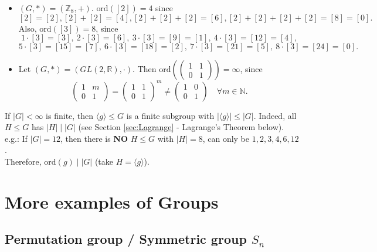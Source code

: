 \begin{example}
\begin{itemize}
    \item $(G, *) = (\mathbb{Z}_8, +)$. $\text{ord}([2]) = 4$ since $$[2]=[2], [2]+[2]=[4], [2]+[2]+[2]=[6], [2]+[2]+[2]+[2]=[8] = [0].$$
    Also, $\text{ord}([3]) = 8$, since 
    $$1 \cdot [3]=[3],\ 2 \cdot [3] =[6],\ 3 \cdot [3]=[9] = [1],\ 4 \cdot [3]=[12] = [4],$$ $$5 \cdot [3]=[15] = [7],\ 6 \cdot [3]=[18] = [2],\ 7 \cdot [3]=[21] = [5],\ 8 \cdot [3] =[24] = [0].$$
    \item Let $(G, *) = (GL(2, \mathbb{R}), \cdot)$. Then 
    $\text{ord}\left( \begin{pmatrix} 1 & 1 \\ 0 & 1 \end{pmatrix} \right) = \infty$, since $$\begin{pmatrix} 1 & m \\ 0 & 1 \end{pmatrix} = \begin{pmatrix} 1 & 1 \\ 0 & 1 \end{pmatrix}^m \neq \begin{pmatrix} 1 & 0 \\ 0 & 1 \end{pmatrix} \quad \forall m \in \mathbb{N}.$$
\end{itemize}
\end{example}
\vspace{1em}
\begin{remark} 
If $|G| < \infty$ is finite, then $\langle g \rangle \le G$ is a finite subgroup with $|\langle g \rangle| \le |G|$. Indeed, all $H \le G$ has $|H| \mid |G|$ (see Section \ref{sec:Lagrange} - Lagrange's Theorem below). \\
e.g.: If $|G|=12$, then there is \textbf{NO} $H \le G$ with $|H|=8$, can only be $1, 2, 3, 4, 6, 12$. \\
Therefore, $\text{ord}(g) \mid |G|$ (take $H = \langle g \rangle$).
\end{remark}

\vspace{1em}
\section{More examples of Groups}
\subsection*{Permutation group / Symmetric group $S_n$}


